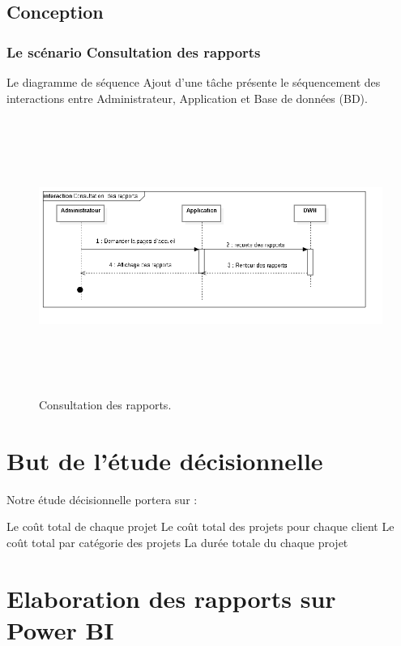 \subsection{Conception}

\subsubsection{Le sc\'{e}nario \guillemotleft{} Consultation des rapports\guillemotright{}}
Le diagramme de s\'{e}quence \guillemotleft{} Ajout d'une t\^{a}che \guillemotright{} pr\'{e}sente le s\'{e}quencement
des interactions entre Administrateur, Application et Base de donn\'{e}es (BD).


\begin{figure}[H]
\center
\includegraphics[width=14cm,height=9cm]{./figures/seq/G.png}
\caption{Consultation des rapports.}
\end{figure}


\section{ But de l'\'{e}tude d\'{e}cisionnelle }

Notre \'{e}tude d\'{e}cisionnelle portera sur :

\textbullet{} Le co\^{u}t total de chaque projet
\textbullet{} Le co\^{u}t total des projets pour chaque client
\textbullet{} Le co\^{u}t total par cat\'{e}gorie des projets
\textbullet{} La dur\'{e}e totale du chaque projet
\bigskip
\section{ Elaboration des rapports sur Power BI }
